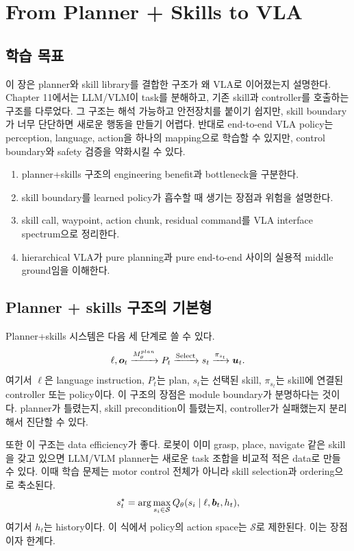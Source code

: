 \chapter{From Planner + Skills to VLA}

\section*{학습 목표}

이 장은 planner와 skill library를 결합한 구조가 왜 VLA로 이어졌는지 설명한다. Chapter 11에서는 LLM/VLM이 task를 분해하고, 기존 skill과 controller를 호출하는 구조를 다루었다. 그 구조는 해석 가능하고 안전장치를 붙이기 쉽지만, skill boundary가 너무 단단하면 새로운 행동을 만들기 어렵다. 반대로 end-to-end VLA policy는 perception, language, action을 하나의 mapping으로 학습할 수 있지만, control boundary와 safety 검증을 약화시킬 수 있다.

\begin{enumerate}
  \item planner+skills 구조의 engineering benefit과 bottleneck을 구분한다.
  \item skill boundary를 learned policy가 흡수할 때 생기는 장점과 위험을 설명한다.
  \item skill call, waypoint, action chunk, residual command를 VLA interface spectrum으로 정리한다.
  \item hierarchical VLA가 pure planning과 pure end-to-end 사이의 실용적 middle ground임을 이해한다.
\end{enumerate}

\section{Planner + skills 구조의 기본형}

Planner+skills 시스템은 다음 세 단계로 쓸 수 있다.
\begin{equation}
  \ell,\bm{o}_t
  \xrightarrow{M_{\theta}^{plan}}
  P_t
  \xrightarrow{\mathrm{Select}}
  s_t
  \xrightarrow{\pi_{s_t}}
  \bm{u}_t.
  \label{eq:planner-skill-basic}
\end{equation}
여기서 $\ell$은 language instruction, $P_t$는 plan, $s_t$는 선택된 skill, $\pi_{s_t}$는 skill에 연결된 controller 또는 policy이다. 이 구조의 장점은 module boundary가 분명하다는 것이다. planner가 틀렸는지, skill precondition이 틀렸는지, controller가 실패했는지 분리해서 진단할 수 있다.

또한 이 구조는 data efficiency가 좋다. 로봇이 이미 grasp, place, navigate 같은 skill을 갖고 있으면 LLM/VLM planner는 새로운 task 조합을 비교적 적은 data로 만들 수 있다. 이때 학습 문제는 motor control 전체가 아니라 skill selection과 ordering으로 축소된다.
\begin{equation}
  s_t^{\star}
  =
  \arg\max_{s_i\in\mathcal{S}}
  Q_{\theta}(s_i \mid \ell,\bm{b}_t,h_t),
  \label{eq:skill-selection-q}
\end{equation}
여기서 $h_t$는 history이다. 이 식에서 policy의 action space는 $\mathcal{S}$로 제한된다. 이는 장점이자 한계다.

